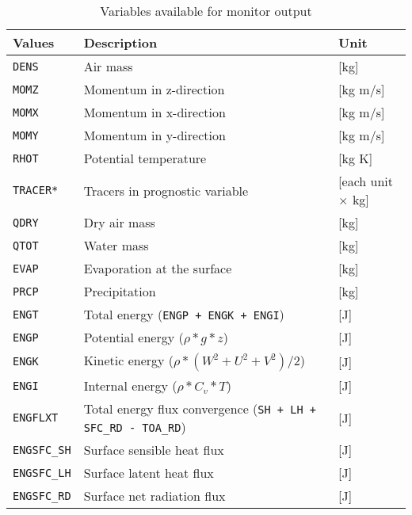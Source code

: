 \begin{table}[h]
\begin{center}
  \caption{Variables available for monitor output}
  \label{tab:varlist_monitor}
  \begin{tabularx}{150mm}{|l|X|l|} \hline
    \rowcolor[gray]{0.9}  Values & Description & Unit \\ \hline
      \verb|DENS|         & Air mass                                  & [kg]     \\
      \verb|MOMZ|         & Momentum in z-direction                   & [kg m/s] \\
      \verb|MOMX|         & Momentum in x-direction                   & [kg m/s] \\
      \verb|MOMY|         & Momentum in y-direction                   & [kg m/s] \\
      \verb|RHOT|         & Potential temperature                     & [kg K]   \\
      \verb|TRACER*|      & Tracers in prognostic variable            & [each unit $\times$ kg] \\
      \verb|QDRY|         & Dry air mass                              & [kg] \\
      \verb|QTOT|         & Water mass                                & [kg] \\
      \verb|EVAP|         & Evaporation at the surface                & [kg] \\
      \verb|PRCP|         & Precipitation                             & [kg] \\
      \verb|ENGT|         & Total     energy (\verb|ENGP + ENGK + ENGI|)  & [J] \\
      \verb|ENGP|         & Potential energy ($\rho * g * z$)             & [J] \\
      \verb|ENGK|         & Kinetic   energy ($\rho * (W^2+U^2+V^2) / 2$) & [J] \\
      \verb|ENGI|         & Internal  energy ($\rho * C_v * T$)           & [J] \\
      \verb|ENGFLXT|      & Total energy flux convergence (\verb|SH + LH + SFC_RD - TOA_RD|) & [J] \\
      \verb|ENGSFC_SH|    & Surface sensible heat flux                & [J] \\
      \verb|ENGSFC_LH|    & Surface latent   heat flux                & [J] \\
      \verb|ENGSFC_RD|    & Surface net radiation flux                & [J] \\

\end{tabularx}
\end{center}
\end{table}
